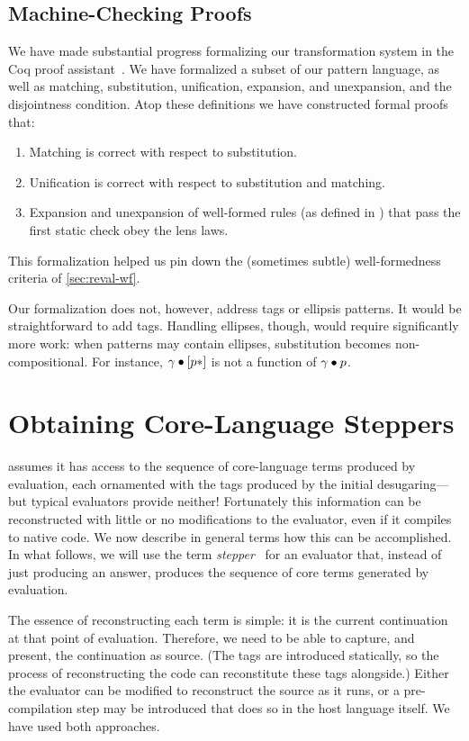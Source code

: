 \subsection{Machine-Checking Proofs}
\label{sec:reval-coq}

We have made substantial progress formalizing our transformation system in
the Coq proof assistant~\cite{coq-manual}. We have formalized a subset of
our pattern language, as well as matching, substitution, unification,
expansion, and unexpansion, and the disjointness condition. Atop these
definitions we have constructed formal proofs that:
\begin{enumerate}
\item Matching is correct with respect to substitution.
\item Unification is correct with respect to substitution and matching.
\item Expansion and unexpansion of well-formed rules (as defined in
  ) that pass the first static check obey the
  lens laws.
\end{enumerate}
This formalization helped us pin down the (sometimes subtle)
well-formedness criteria of \cref{sec:reval-wf}.

Our formalization does not, however, address tags or ellipsis patterns.
It would be straightforward to add tags. Handling ellipses, though, would
require significantly more work: when patterns may contain ellipses,
substitution becomes non-compositional. For instance,
$\gamma \bullet [p*]$ is not a function of $\gamma \bullet p$.


\section{Obtaining Core-Language Steppers}
\label{sec:reval-lang}


{\Resugarer} assumes it has access to the sequence of core-language terms
produced by evaluation, each ornamented with the tags produced by the
initial desugaring---but typical evaluators provide neither!
Fortunately this information can be reconstructed with little or no
modifications to the evaluator, even if it compiles to native code. We now
describe in general terms how this can be accomplished.  In what follows,
we will use the term \emph{stepper}~\cite{racket-stepper} for an
evaluator that, instead of just producing an answer, produces
the sequence of core terms generated by evaluation.

The essence of reconstructing each term is simple: it is the current
continuation at that point of evaluation. Therefore, we need to be
able to capture, and present, the continuation as source. (The tags
are introduced statically, so the process of reconstructing the code
can reconstitute these tags alongside.) Either the evaluator can be
modified to reconstruct the source as it runs, or a pre-compilation step
may be introduced that does so in the host language itself. We have used
both approaches.

